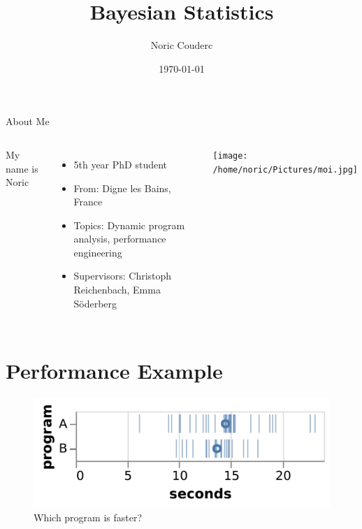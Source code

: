\documentclass[aspectratio=169,xcolor=svgnames]{beamer}
\title[]{Bayesian Statistics}
\author{Noric Couderc}
\date{\today}
\institute{Lund University\\Department of Computer Science}
\begin{document}
\maketitle

\begin{frame}{About Me}
  \begin{columns}
    My name is Noric

    \begin{itemize}
    \item 5th year PhD student
    \item From: Digne les Bains, France
    \item Topics: Dynamic program analysis, performance engineering
    \item Supervisors: Christoph Reichenbach, Emma Söderberg
    \end{itemize}

    \texttt{[image: /home/noric/Pictures/moi.jpg]}

  \end{columns}
\end{frame}

\section{Performance Example}

\begin{frame}
  \begin{figure}[ht]
    \centering
    \includegraphics[width=\textwidth]{figures/samples_a_b.pdf}
    \caption{Which program is faster?}
  \end{figure}

\end{frame}
\end{document}
